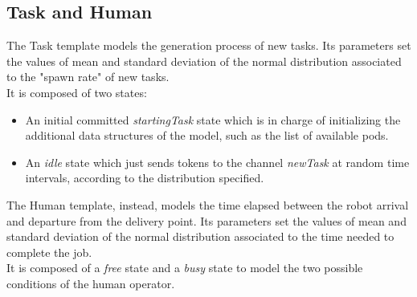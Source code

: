 \documentclass{article}
\begin{document}
		\subsection{Task and Human}
			The Task template models the generation process of new tasks. Its parameters set the values of mean and standard deviation of the normal distribution associated to the "spawn rate" of new tasks.\\
			It is composed of two states:
			\begin{itemize}
				\item An initial committed \emph{startingTask} state which is in charge of initializing the additional data structures of the model, such as the list of available pods.
				\item An \emph{idle} state which just sends tokens to the channel \emph{newTask} at random time intervals, according to the distribution specified.
			\end{itemize}
			The Human template, instead, models the time elapsed between the robot arrival and departure from the delivery point. Its parameters set the values of mean and standard deviation of the normal distribution associated to the time needed to complete the job.\\
			It is composed of a \emph{free} state and a \emph{busy} state to model the two possible conditions of the human operator. 
			
\end{document}
